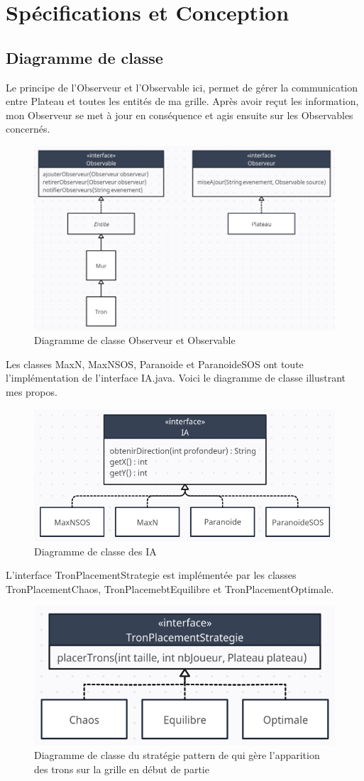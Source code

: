 \documentclass[a4paper,12pt]{article}
\begin{document}
\section{Spécifications et Conception}
\subsection{Diagramme de classe}
Le principe de l'Observeur et l'Observable ici, permet de gérer la communication entre Plateau et toutes les entités de ma grille. Après avoir reçut les information, mon Observeur se met à jour en conséquence et agis ensuite sur les Observables concernés.

	\begin{figure}[h!]
		\centering	\includegraphics[width=0.5\linewidth]{DiagObserveurObservable}
		\caption{Diagramme de classe Observeur et Observable}
	\end{figure}
	
Les classes MaxN, MaxNSOS, Paranoide et ParanoideSOS ont toute l'implémentation de l'interface IA.java. Voici le diagramme de classe illustrant mes propos.
	
	\begin{figure}[h!]
		\centering	\includegraphics[width=0.5\linewidth]{DiagIA}
		\caption{Diagramme de classe des IA}
	\end{figure}
	
L'interface TronPlacementStrategie est implémentée par les classes TronPlacementChaos, TronPlacemebtEquilibre et TronPlacementOptimale.

\begin{figure}[h!]
		\centering	\includegraphics[width=0.5\linewidth]{DiagPlacement}
		\caption{Diagramme de classe du stratégie pattern de qui gère l'apparition des trons sur la grille en début de partie}
	\end{figure}
\end{document}
